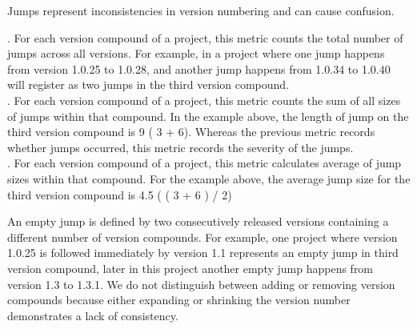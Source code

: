\documentclass[conference]{IEEEtran}
\begin{document}
Jumps represent inconsistencies in version numbering and can cause confusion.
 
.  For each version compound of a project, this metric counts the total number of jumps across all versions. For example, in a project where one jump happens from version 1.0.25 to 1.0.28, and another jump happens from 1.0.34 to 1.0.40 will register as two jumps in the third version compound.\\

.  For each version compound of a project, this metric counts the sum of all sizes of jumps within that compound. 
In the example above, the length of jump on the third version compound is 
9 ( 3 + 6). Whereas the previous metric records whether jumps occurred, this metric records the severity of the jumps. \\
 
. For each version compound of a project, this metric calculates average of  jump sizes within that compound. For the example above, the average jump size for the third version compound is 4.5 ( ( 3 + 6 ) / 2)
 



 An empty jump is defined by two consecutively released versions containing a different number of version compounds. 
For example, one project where version 1.0.25 is followed immediately by version 1.1 represents an empty jump in third version compound, later in this project another empty jump happens from version 1.3 to 1.3.1. We do not distinguish between adding or removing version compounds because either expanding or shrinking the version number demonstrates a lack of consistency.  \\
\end{document}
